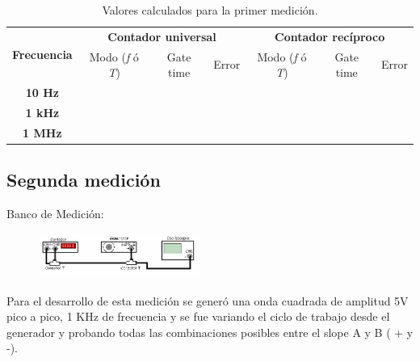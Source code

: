 \documentclass{article}
\begin{document}
\begin{table}[!hbt]
	\begin{center}

		\begin{tabular}{|c|c|c|c|c|c|c|} \hline
			\multirow{2}{*}{\textbf{Frecuencia}}
			& \multicolumn{3}{c|}{\textbf{Contador universal}} & \multicolumn{3}{c|}{\textbf{Contador recíproco}} \\\cline{2-7}
			& Modo (\textit{f} ó \textit{T}) & Gate time & Error & Modo (\textit{f} ó \textit{T}) & Gate time & Error \\\hline
			
			\textbf{10 Hz} &  &  &  &  &  &  \\\hline
			\textbf{1 kHz} &  &  &  &  &  &  \\\hline
			\textbf{1 MHz} &  &  &  &  &  &  \\\hline
		\end{tabular}

	\caption{Valores calculados para la primer medición.}
	\end{center}
\end{table}
\medskip



\subsection{Segunda medición}

	Banco de Medición:
	
	\begin{figure}[h]
				\centering
				\includegraphics[width=0.47\textwidth]{images/bancoMedicionMed2.jpg}
				\medskip
	\end{figure}
	\bigskip\bigskip
	
	Para el desarrollo de esta medición se generó una onda cuadrada de amplitud 5V pico a pico, 1 KHz de frecuencia y se fue variando el ciclo de trabajo desde el generador y probando todas las combinaciones posibles entre el slope A y B ( + y -). 
\bigskip
\end{document}

